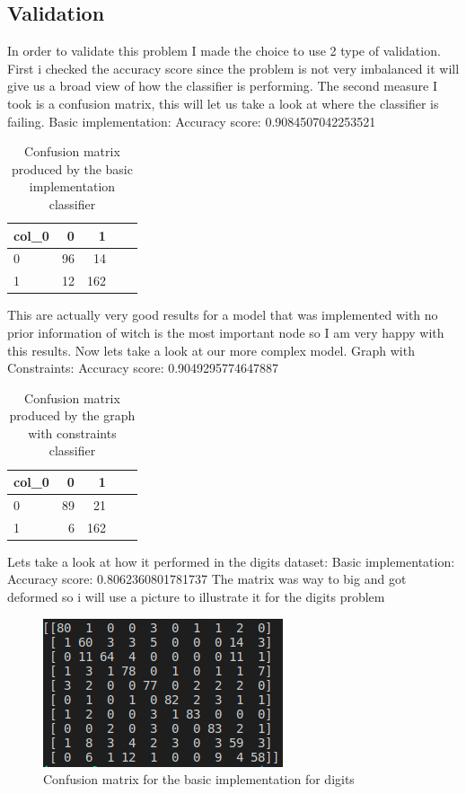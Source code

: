 \documentclass{article} %
\begin{document}
\subsection{Validation}
 
In order to validate this problem I made the choice to use 2 type of validation. First i checked the accuracy score since the problem is not very imbalanced it will give us a broad view of how the classifier is performing. The second measure I took is a confusion matrix, this will let us take a look at where the classifier is failing.
Basic implementation:
Accuracy score: 0.9084507042253521
\begin{table}[!h]
\centering
\begin{tabular}{lrrrr}
\toprule \hline
col\_0 &   0 &   1 & \\\hline
0     &  96 &   14 & \\\hline
1     &   12 &  162  \\\hline
\bottomrule \hline
\end{tabular}
\caption{Confusion matrix produced by the basic implementation classifier}
 \label{tab:BI}
\end{table}
This are actually very good results for a model that was implemented with no prior information of witch is the most important node so I am very happy with this results. Now lets take a look at our more complex model.
Graph with Constraints:
Accuracy score: 0.9049295774647887
\begin{table}[!h]
\centering
\begin{tabular}{lrrrr}
\toprule \hline
col\_0 &   0 &   1 & \\\hline
0     &  89 &   21 & \\\hline
1     &   6 &  162  \\\hline
\bottomrule \hline
\end{tabular}
\caption{Confusion matrix produced by the graph with constraints classifier}
 \label{tab:CG}
\end{table}
\bigskip
Lets take a look at how it performed in the digits dataset:
\bigskip
Basic implementation:
Accuracy score: 0.8062360801781737
The matrix was way to big and got deformed so i will use a picture to illustrate it for the digits problem
\begin{figure}[h!]
  \includegraphics[scale = 1]{CFBI.png}
  \centering
  \caption{Confusion matrix for the basic implementation for digits}
  \label{fig:Confusion matrix for the basic implementation for digits}
\end{figure}
\bigskip
\bigskip
\end{document}
